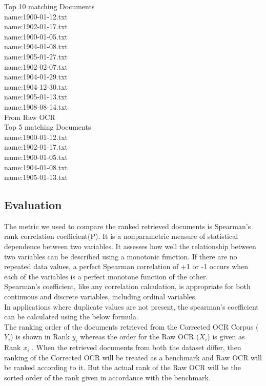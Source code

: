 Top 10 matching Documents \\
name:1900-01-12.txt \\
name:1902-01-17.txt \\
name:1900-01-05.txt \\
name:1904-01-08.txt \\
name:1905-01-27.txt \\
name:1902-02-07.txt \\
name:1904-01-29.txt \\
name:1904-12-30.txt \\
name:1905-01-13.txt \\
name:1908-08-14.txt \\

From Raw OCR \\

Top 5 matching Documents \\
name:1900-01-12.txt \\
name:1902-01-17.txt \\
name:1900-01-05.txt \\ 
name:1904-01-08.txt \\
name:1905-01-13.txt \\



\subsection{Evaluation}
The metric we used to compare the ranked retrieved documents is Spearman's rank correlation coefficient(P). It is a nonparametric measure of statistical dependence between two variables. It assesses how well the relationship between two variables can be described using a monotonic function. If there are no repeated data values, a perfect Spearman correlation of +1 or -1 occurs when each of the variables is a perfect monotone function of the other.\\
Spearman's coefficient, like any correlation calculation, is appropriate for both continuous and discrete variables, including ordinal variables.\\
In applications where duplicate values are not present, the spearman's coefficient can be calculated using the below formula.\\
The ranking order of the documents retrieved from the Corrected OCR Corpus ($Y_{i}$) is shown in Rank $y_{i}$ whereas the order for the Raw OCR ($X_{i}$) is given as Rank $x_{i}$ . When the retrieved documents from both the dataset differ, then ranking of the Corrected OCR will be treated as a benchmark and Raw OCR will be ranked according to it. But the actual rank of the Raw OCR will be the sorted order of the rank given in accordance with the benchmark. \\

